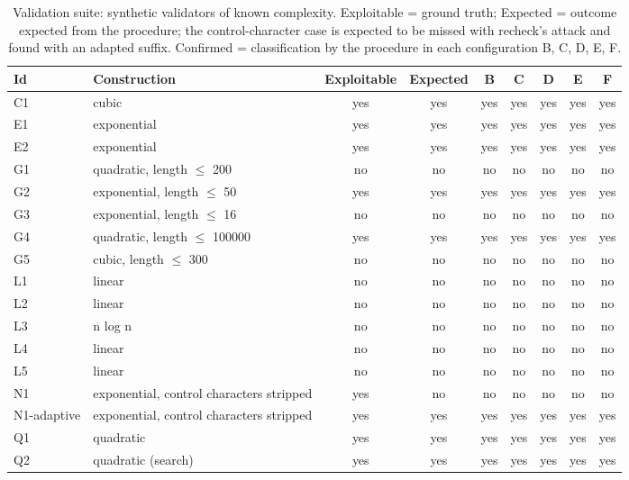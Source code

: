 \begin{table}[H]
\caption{Validation suite: synthetic validators of known complexity. Exploitable = ground truth; Expected = outcome expected from the procedure; the control-character case is expected to be missed with recheck's attack and found with an adapted suffix. Confirmed = classification by the procedure in each configuration B, C, D, E, F.\label{tab:validation}}
\begin{tabularx}{\textwidth}{lXccccccc}
\toprule
\textbf{Id} & \textbf{Construction} & \textbf{Exploitable} & \textbf{Expected} & \textbf{B} & \textbf{C} & \textbf{D} & \textbf{E} & \textbf{F}\\
\midrule
C1 & cubic & yes & yes & yes & yes & yes & yes & yes\\
E1 & exponential & yes & yes & yes & yes & yes & yes & yes\\
E2 & exponential & yes & yes & yes & yes & yes & yes & yes\\
G1 & quadratic, length $\le$ 200 & no & no & no & no & no & no & no\\
G2 & exponential, length $\le$ 50 & yes & yes & yes & yes & yes & yes & yes\\
G3 & exponential, length $\le$ 16 & no & no & no & no & no & no & no\\
G4 & quadratic, length $\le$ 100000 & yes & yes & yes & yes & yes & yes & yes\\
G5 & cubic, length $\le$ 300 & no & no & no & no & no & no & no\\
L1 & linear & no & no & no & no & no & no & no\\
L2 & linear & no & no & no & no & no & no & no\\
L3 & n log n & no & no & no & no & no & no & no\\
L4 & linear & no & no & no & no & no & no & no\\
L5 & linear & no & no & no & no & no & no & no\\
N1 & exponential, control characters stripped & yes & no & no & no & no & no & no\\
N1-adaptive & exponential, control characters stripped & yes & yes & yes & yes & yes & yes & yes\\
Q1 & quadratic & yes & yes & yes & yes & yes & yes & yes\\
Q2 & quadratic (search) & yes & yes & yes & yes & yes & yes & yes\\
\bottomrule
\end{tabularx}
\end{table}

